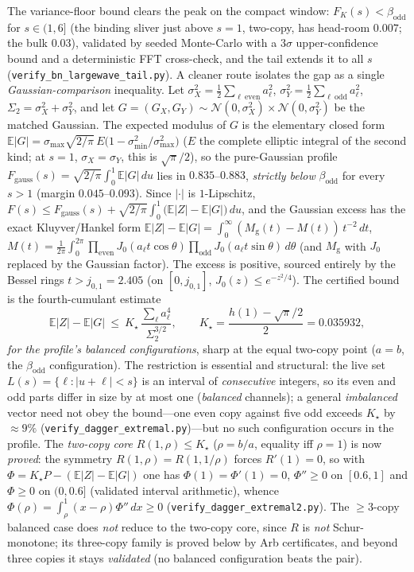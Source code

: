 \noindent The variance-floor bound clears the peak on the compact window: $F_K(s)<\beta_{\mathrm{odd}}$ for
$s\in(1,6]$ (the binding sliver just above $s=1$, two-copy, has head-room $0.007$; the bulk $0.03$),
validated by seeded Monte-Carlo with a $3\sigma$ upper-confidence bound and a deterministic FFT cross-check,
and the tail extends it to all $s$ (\texttt{verify\_bn\_largewave\_tail.py}). A cleaner route isolates the
gap as a single \emph{Gaussian-comparison} inequality. Let $\sigma_X^2=\tfrac12\sum_{\ell\ \mathrm{even}}a_\ell^2$,
$\sigma_Y^2=\tfrac12\sum_{\ell\ \mathrm{odd}}a_\ell^2$, $\Sigma_2=\sigma_X^2+\sigma_Y^2$, and let
$G=(G_X,G_Y)\sim\mathcal N(0,\sigma_X^2)\times\mathcal N(0,\sigma_Y^2)$ be the matched Gaussian. The expected
modulus of $G$ is the elementary closed form $\mathbb E|G|=\sigma_{\max}\sqrt{2/\pi}\,E\bigl(1-\sigma_{\min}^2/\sigma_{\max}^2\bigr)$
($E$ the complete elliptic integral of the second kind; at $s=1$, $\sigma_X=\sigma_Y$, this is $\sqrt\pi/2$),
so the pure-Gaussian profile $F_{\mathrm{gauss}}(s)=\sqrt{2/\pi}\int_0^1\mathbb E|G|\,du$ lies in $0.835$--$0.883$,
\emph{strictly below} $\beta_{\mathrm{odd}}$ for every $s>1$ (margin $0.045$--$0.093$). Since $|\cdot|$ is
$1$-Lipschitz, $F(s)\le F_{\mathrm{gauss}}(s)+\sqrt{2/\pi}\int_0^1\bigl(\mathbb E|Z|-\mathbb E|G|\bigr)\,du$, and
the Gaussian excess has the exact Kluyver/Hankel form $\mathbb E|Z|-\mathbb E|G|=\int_0^\infty(M_{\mathrm g}(t)-M(t))\,t^{-2}\,dt$,
$M(t)=\tfrac1{2\pi}\int_0^{2\pi}\prod_{\mathrm{even}}J_0(a_\ell t\cos\theta)\prod_{\mathrm{odd}}J_0(a_\ell t\sin\theta)\,d\theta$
(and $M_{\mathrm g}$ with $J_0$ replaced by the Gaussian factor). The excess is positive, sourced entirely by
the Bessel rings $t>j_{0,1}=2.405$ (on $[0,j_{0,1}]$, $J_0(z)\le e^{-z^2/4}$). The certified bound is the
fourth-cumulant estimate
\[
  \mathbb E|Z|-\mathbb E|G|\ \le\ K_\star\,\frac{\sum_\ell a_\ell^4}{\Sigma_2^{3/2}},\qquad
  K_\star=\frac{h(1)-\sqrt\pi/2}{2}=0.035932,
\]
\emph{for the profile's balanced configurations}, sharp at the equal two-copy point ($a=b$, the
$\beta_{\mathrm{odd}}$ configuration). The restriction is essential and structural: the live set
$L(s)=\{\ell:|u+\ell|<s\}$ is an interval of \emph{consecutive} integers, so its even and odd parts differ in
size by at most one (\emph{balanced} channels); a general \emph{imbalanced} vector need not obey the
bound---one even copy against five odd exceeds $K_\star$ by $\approx9\%$
(\texttt{verify\_dagger\_extremal.py})---but no such configuration occurs in the profile. The
\emph{two-copy core} $R(1,\rho)\le K_\star$ ($\rho=b/a$, equality iff $\rho=1$) is now \emph{proved}: the
symmetry $R(1,\rho)=R(1,1/\rho)$ forces $R'(1)=0$, so with $\Phi=K_\star P-(\mathbb E|Z|-\mathbb E|G|)$ one has
$\Phi(1)=\Phi'(1)=0$, $\Phi''\ge0$ on $[0.6,1]$ and $\Phi\ge0$ on $(0,0.6]$ (validated interval arithmetic),
whence $\Phi(\rho)=\int_\rho^1(x-\rho)\Phi''\,dx\ge0$ (\texttt{verify\_dagger\_extremal2.py}). The
$\ge3$-copy balanced case does \emph{not} reduce to the two-copy core, since $R$ is \emph{not} Schur-monotone;
its three-copy family is proved below by Arb certificates, and beyond three copies it stays \emph{validated}
(no balanced configuration beats the pair).

